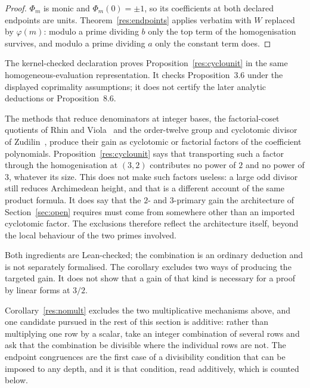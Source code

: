 \documentclass[11pt]{article}
\begin{document}
\begin{proof}
$\Phi_m$ is monic and $\Phi_m(0)=\pm1$, so its coefficients at both declared
endpoints are units.  Theorem~\ref{res:endpoints} applies verbatim with $W$
replaced by $\varphi(m)$: modulo a prime dividing $b$ only the top term of the
homogenisation survives, and modulo a prime dividing $a$ only the constant term
does.
\end{proof}

The kernel-checked declaration
proves Proposition~\ref{res:cyclounit} in the same homogeneous-evaluation
representation.  It checks Proposition~3.6 under the displayed coprimality
assumptions; it does not certify the later analytic deductions or
Proposition~8.6.

The methods that reduce denominators at integer bases, the factorial-coset
quotients of Rhin and Viola~\cite{rhinviola1996} and the order-twelve group and
cyclotomic divisor of Zudilin~\cite{zudilin2004}, produce their gain as
cyclotomic or factorial factors of the coefficient polynomials.
Proposition~\ref{res:cyclounit} says that transporting such a factor through the
homogenisation at $(3,2)$ contributes no power of $2$ and no power of $3$,
whatever its size.  This does not make such factors useless: a large odd
divisor still reduces Archimedean height, and that is a different account of the
same product formula.  It does say that the $2$- and $3$-primary gain the
architecture of Section~\ref{sec:open} requires must come from somewhere other
than an imported cyclotomic factor.  The exclusions therefore reflect the
architecture itself, beyond the local behaviour of the two primes involved.

\noindent Both ingredients are Lean-checked; the combination is an ordinary
deduction and is not separately formalised.  The corollary excludes two ways of
producing the targeted gain.  It does not show that a gain of that kind is
necessary for a proof by linear forms at \(3/2\).

Corollary~\ref{res:nomult} excludes the two multiplicative mechanisms above,
and one candidate pursued in the rest of this section is additive: rather than multiplying one
row by a scalar, take an integer combination of several rows and ask that the
combination be divisible where the individual rows are not.  The endpoint
congruences are the first case of a divisibility condition that can be imposed
to any depth, and it is that condition, read additively, which is counted
below.
\end{document}
